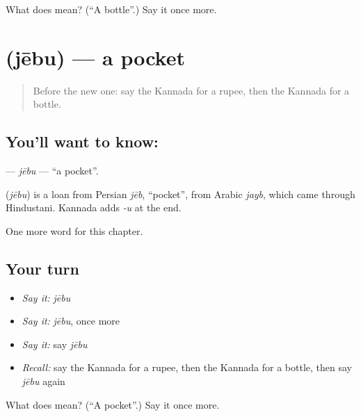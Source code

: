 \begin{tcolorbox}[breakable,colback=teal!4,colframe=teal!35!black,title={Before you move on}]
What does  mean? (\textquotedblleft{}A bottle\textquotedblright{}.) Say it once more.
\end{tcolorbox}
\section[\texorpdfstring{\kn{ಜೇಬು} (jēbu)}{ಜೇಬು (jēbu)}]{ (jēbu) — a pocket}

\label{lesson:KA-C138-jebu}



\begin{quote}
Before the new one: say the Kannada for a rupee, then the Kannada for a bottle.
\end{quote}

\subsection*{You'll want to know: }
\textbf{} — \emph{jēbu} — \textquotedblleft{}a pocket\textquotedblright{}.

\begin{cousinweb}
\textbf{} (\emph{jēbu}) is a loan from Persian \emph{jēb}, \textquotedblleft{}pocket\textquotedblright{}, from Arabic \emph{jayb}, which came through Hindustani. Kannada adds \emph{-u} at the end.
\end{cousinweb}

\begin{grammarlens}[title={What you've built}]
One more word for this chapter.
\end{grammarlens}

\subsection*{Your turn}
\begin{itemize}
\raggedright
  \item \emph{Say it:} \emph{jēbu}
  \item \emph{Say it:} \emph{jēbu}, once more
  \item \emph{Say it:} say \emph{jēbu}
  \item \emph{Recall:} say the Kannada for a rupee, then the Kannada for a bottle, then say \emph{jēbu} again
\end{itemize}

\begin{tcolorbox}[breakable,colback=teal!4,colframe=teal!35!black,title={Before you move on}]
What does  mean? (\textquotedblleft{}A pocket\textquotedblright{}.) Say it once more.
\end{tcolorbox}
